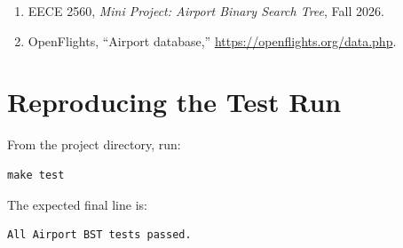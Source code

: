 \documentclass[12pt]{article}
\begin{document}
\begin{enumerate}
    \item EECE 2560, \textit{Mini Project: Airport Binary Search Tree}, Fall 2026.
    \item OpenFlights, ``Airport database,'' \url{https://openflights.org/data.php}.
\end{enumerate}

\appendix
\section{Reproducing the Test Run}

From the project directory, run:

\begin{Verbatim}[fontsize=\small,frame=single]
make test
\end{Verbatim}

The expected final line is:

\begin{Verbatim}[fontsize=\small,frame=single]
All Airport BST tests passed.
\end{Verbatim}
\end{document}
